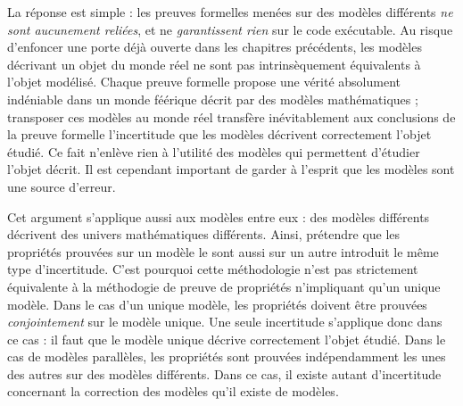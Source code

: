 		La réponse est simple : les preuves formelles menées sur des modèles différents \emph{ne sont aucunement reliées}, et ne \emph{garantissent rien} sur le code exécutable. Au risque d'enfoncer une porte déjà ouverte dans les chapitres précédents, les modèles décrivant un objet du monde réel ne sont pas intrinsèquement équivalents à l'objet modélisé. Chaque preuve formelle propose une vérité absolument indéniable dans un monde féérique décrit par des modèles mathématiques ; transposer ces modèles au monde réel transfère inévitablement aux conclusions de la preuve formelle l'incertitude que les modèles décrivent correctement l'objet étudié. Ce fait n'enlève rien à l'utilité des modèles qui permettent d'étudier l'objet décrit. Il est cependant important de garder à l'esprit que les modèles sont une source d'erreur.

		Cet argument s'applique aussi aux modèles entre eux : des modèles différents décrivent des univers mathématiques différents. Ainsi, prétendre que les propriétés prouvées sur un modèle le sont aussi sur un autre introduit le même type d'incertitude. C'est pourquoi cette méthodologie n'est pas strictement équivalente à la méthodogie de preuve de propriétés n'impliquant qu'un unique modèle. Dans le cas d'un unique modèle, les propriétés doivent être prouvées \emph{conjointement} sur le modèle unique. Une seule incertitude s'applique donc dans ce cas : il faut que le modèle unique décrive correctement l'objet étudié. Dans le cas de modèles parallèles, les propriétés sont prouvées indépendamment les unes des autres sur des modèles différents. Dans ce cas, il existe autant d'incertitude concernant la correction des modèles qu'il existe de modèles.


